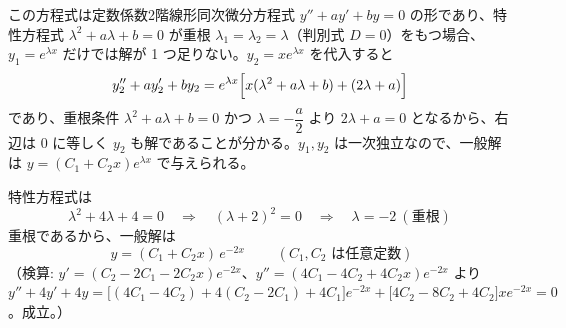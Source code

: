 
この方程式は定数係数2階線形同次微分方程式 $y'' + ay' + by = 0$ の形であり、特性方程式 $\lambda^{2} + a\lambda + b = 0$ が重根 $\lambda_{1}=\lambda_{2}=\lambda$（判別式 $D=0$）をもつ場合、$y_{1} = e^{\lambda x}$ だけでは解が 1 つ足りない。$y_{2} = xe^{\lambda x}$ を代入すると
\[
y_{2}'' + a y_{2}' + b y_{2}
= e^{\lambda x}\Bigl[x(\lambda^{2}+a\lambda+b) + (2\lambda + a)\Bigr]
\]
であり、重根条件 $\lambda^{2}+a\lambda+b=0$ かつ $\lambda = -\dfrac{a}{2}$ より $2\lambda+a=0$ となるから、右辺は $0$ に等しく $y_2$ も解であることが分かる。$y_1, y_2$ は一次独立なので、一般解は $y = (C_{1}+C_{2}x)e^{\lambda x}$ で与えられる。

特性方程式は
\[
\lambda^{2} + 4\lambda + 4 = 0 \quad\Longrightarrow\quad (\lambda+2)^{2} = 0
\quad\Longrightarrow\quad \lambda = -2 \ (\text{重根})
\]
重根であるから、一般解は
\[
\boxed{\; y = (C_{1} + C_{2}x)\,e^{-2x} \;}
\qquad (C_{1}, C_{2} \text{ は任意定数})
\]
（検算: $y' = (C_{2} - 2C_{1} - 2C_{2}x)e^{-2x}$、$y'' = (4C_{1} - 4C_{2} + 4C_{2}x)e^{-2x}$ より
$y''+4y'+4y = \bigl[(4C_{1}-4C_{2}) + 4(C_{2}-2C_{1}) + 4C_{1}\bigr]e^{-2x} + \bigl[4C_{2} - 8C_{2} + 4C_{2}\bigr]xe^{-2x} = 0$。成立。）
